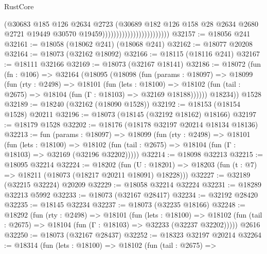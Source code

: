 \begin{lexlean}{RustCore}
\begin{coremodule}
                                                (@30683
                                                  @185
                                                  @126
                                                  @2634
                                                  @2723
                                                  (@30689
                                                    @182
                                                    @126
                                                    @158
                                                    @28
                                                    @2634
                                                    @2680
                                                    @2721
                                                    @19449
                                                    @30570
                                                    @19459))))))))))))))))))))))))
@32157 := @18056 @241
@32161 := @18058 (@18062 @241) (@18068 @241)
@32162 := @18077 @20208
@32164 := @18073 (@32162 @18092)
@32166 := @18115 (@18116 @241)
@32167 := @18111 @32166
@32169 := @18073 (@32167 @18141)
@32186 := @18072
    (fun (fn : @106) =>
    @32164
      (@18095
        (@18098
          (fun (params : @18097) =>
          @18099
            (fun (rty : @2498) =>
            @18101
              (fun (lets : @18100) =>
              @18102 (fun (tail : @2675) => @18104 (fun (Γ : @18103) => @32169 @18188))))))
        @18234))
    @1528
@32189 := @18240 (@32162 (@18090 @1528))
@32192 := @18153 (@18154 @1528) @20211
@32196 := @18073 (@18145 (@32192 @18162) @18166)
@32197 := @18179 @1528
@32202 := @18176 (@18178 @32197 @20214 @18134 @18136)
@32213 := fun (params : @18097) =>
  @18099
    (fun (rty : @2498) =>
    @18101
      (fun (lets : @18100) =>
      @18102 (fun (tail : @2675) => @18104 (fun (Γ : @18103) => @32169 (@32196 @32202)))))
@32214 := @18098 @32213
@32215 := @18095 @32214
@32224 := @18202
    (fun (U : @18201) => @18203 (fun (t : @7) => @18211 (@18073 (@18217 @20211 @18091) @18228)))
@32227 := @32189 (@32215 @32224) @20209
@32229 := @18058 @32214 @32224
@32231 := @18289 @32213 @5992
@32233 := @18073 (@32167 @28417)
@32234 := @32192 @28420
@32235 := @18145 @32234
@32237 := @18073 (@32235 @18166)
@32248 := @18292
    (fun (rty : @2498) =>
    @18101
      (fun (lets : @18100) =>
      @18102 (fun (tail : @2675) => @18104 (fun (Γ : @18103) => @32233 (@32237 @32202)))))
    @2616
@32250 := @18073 (@32167 @28437)
@32252 := @18323 @32197 @20214
@32264 := @18314
    (fun (lets : @18100) =>
    @18102
      (fun (tail : @2675) =>

\end{coremodule}
\end{lexlean}

